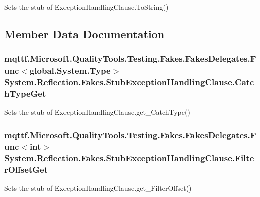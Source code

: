 Sets the stub of Exception\-Handling\-Clause.\-To\-String()



\subsection{Member Data Documentation}
\hypertarget{class_system_1_1_reflection_1_1_fakes_1_1_stub_exception_handling_clause_a5d1c643be4992aebdebae094e8f175b2}{
\subsubsection[{Catch\-Type\-Get}]{\setlength{\rightskip}{0pt plus 5cm}mqttf.\-Microsoft.\-Quality\-Tools.\-Testing.\-Fakes.\-Fakes\-Delegates.\-Func$<$global.\-System.\-Type$>$ System.\-Reflection.\-Fakes.\-Stub\-Exception\-Handling\-Clause.\-Catch\-Type\-Get}}\label{class_system_1_1_reflection_1_1_fakes_1_1_stub_exception_handling_clause_a5d1c643be4992aebdebae094e8f175b2}


Sets the stub of Exception\-Handling\-Clause.\-get\-\_\-\-Catch\-Type()

\hypertarget{class_system_1_1_reflection_1_1_fakes_1_1_stub_exception_handling_clause_a54d98f2c32cfd5d7f779d7df0cec2454}{
\subsubsection[{Filter\-Offset\-Get}]{\setlength{\rightskip}{0pt plus 5cm}mqttf.\-Microsoft.\-Quality\-Tools.\-Testing.\-Fakes.\-Fakes\-Delegates.\-Func$<$int$>$ System.\-Reflection.\-Fakes.\-Stub\-Exception\-Handling\-Clause.\-Filter\-Offset\-Get}}\label{class_system_1_1_reflection_1_1_fakes_1_1_stub_exception_handling_clause_a54d98f2c32cfd5d7f779d7df0cec2454}


Sets the stub of Exception\-Handling\-Clause.\-get\-\_\-\-Filter\-Offset()


